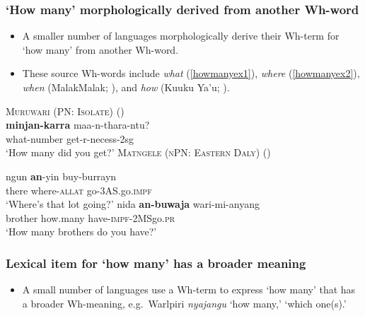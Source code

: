 \documentclass{article}
\begin{document}
\subsubsection{`How many' morphologically derived from another Wh-word}
\begin{itemize}
\item A smaller number of languages morphologically derive their Wh-term for `how many' from another Wh-word.
\item These source Wh-words include \textit{what} (\ref{howmanyex1}), \textit{where} (\ref{howmanyex2}), \textit{when} (MalakMalak; \citealt[17]{tryon74}), and \textit{how} (Kuuku Ya'u; \citealt[91]{thompson88}).
\end{itemize}
\begin{exe}
  \ex \label{howmanyex1} \textsc{Muruwari (PN: Isolate)} (\citealt[122]{oates88})\\
  \gll \textbf{minjan-karra} maa-n-thara-ntu?\\
  what-number get-{\sc r-necess-2sg}\\
  \glt `How many did you get?' %
  \ex \label{howmanyex2} \textsc{Matngele (nPN: Eastern Daly)} (\citealt[51]{zandvoort99})
  \begin{xlist}
    \ex \gll ngun \textbf{an}-yin buy-burrayn\\
    there where-\textsc{allat} go-3AS.go.\textsc{impf}\\
    \glt `Where's that lot going?' %
    \ex \gll nida \textbf{an-buwaja} wari-mi-anyang\\
    brother how.many have-\textsc{impf}-2MSgo.\textsc{pr}\\
    \glt `How many brothers do you have?' %
  \end{xlist}
\end{exe}

\subsubsection{Lexical item for `how many' has a broader meaning}

\begin{itemize}
\item A small number of languages use a Wh-term to express `how many' that has a broader Wh-meaning, e.g.\ Warlpiri \textit{nyajangu} `how many,' `which one(s).'
\end{itemize}
\end{document}
